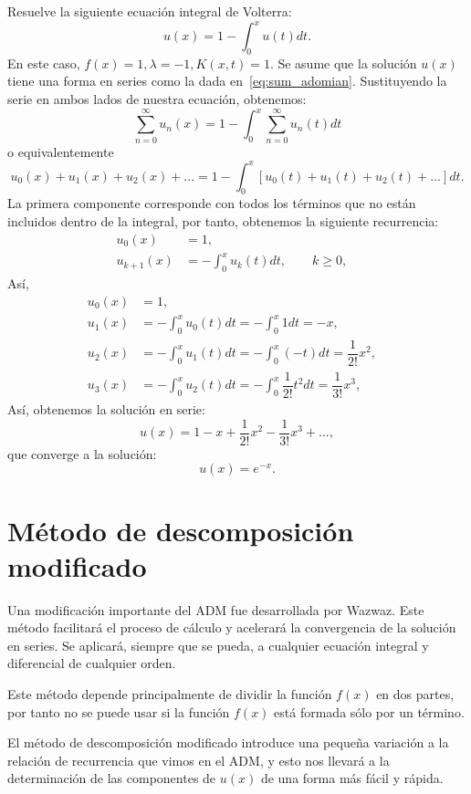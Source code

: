 \begin{ejemplo}
	Resuelve la siguiente ecuación integral de Volterra:
	\begin{equation}
		u(x) = 1 - \int_{0}^{x} u(t)dt.
	\end{equation}
	En este caso, $f(x) = 1, \lambda = -1, K(x,t) = 1.$ Se asume que la solución $u(x)$ tiene una forma en series como la dada en~\eqref{eq:sum_adomian}. Sustituyendo la serie en ambos lados de nuestra ecuación, obtenemos:
	\begin{equation}
		\sum_{n=0}^{\infty} u_n(x) = 1 - \int_{0}^{x} \sum_{n=0}^{\infty} u_n(t)dt
	\end{equation}
	o equivalentemente
	\begin{equation}
		u_0(x) + u_1(x) + u_2(x) + ... = 1 - \int_0^x [u_0(t) + u_1(t) + u_2(t) + ...]dt.
	\end{equation}
	La primera componente corresponde con todos los términos que no están incluidos dentro de la integral, por tanto, obtenemos la siguiente recurrencia:
	\begin{align}
		u_0(x) &= 1,      &   \\
		u_{k+1}(x) &= - \int_{0}^{x} u_k(t)dt, \qquad k \geqslant 0,         & 
	\end{align}
	Así,
	\begin{align}
		u_0(x) &= 1,      &   \\
		u_{1}(x) &= - \int_{0}^{x} u_0(t)dt = -\int_{0}^{x} 1dt = -x,    &  \\
		u_{2}(x) &= - \int_{0}^{x} u_1(t)dt = -\int_{0}^{x} (-t)dt = \dfrac{1}{2!}x^2,    &  \\
		u_{3}(x) &= - \int_{0}^{x} u_2(t)dt = -\int_{0}^{x} \dfrac{1}{2!}t^2dt = \dfrac{1}{3!}x^3,    & 
	\end{align}	
	Así, obtenemos la solución en serie:
	\begin{equation}
		u(x) = 1 - x + \dfrac{1}{2!}x^2 - \dfrac{1}{3!}x^3 + ...,
	\end{equation}
	que converge a la solución:
	\begin{equation}
		u(x) = e^{-x}.
	\end{equation}
\end{ejemplo}

\section{Método de descomposición modificado}
Una modificación importante del ADM fue desarrollada por Wazwaz. Este método facilitará el proceso de cálculo y acelerará la convergencia de la solución en series. Se aplicará, siempre que se pueda, a cualquier ecuación integral y diferencial de cualquier orden.
\begin{observacion}
	Este método depende principalmente de dividir la función $f(x)$ en dos partes, por tanto no se puede usar si la función $f(x)$ está formada sólo por un término.
\end{observacion}
El método de descomposición modificado introduce una pequeña variación a la relación de recurrencia que vimos en el ADM, y esto nos llevará a la determinación de las componentes de $u(x)$ de una forma más fácil y rápida.

